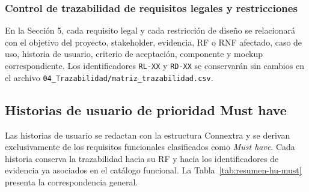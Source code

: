 \documentclass[12pt,a4paper]{article}
\begin{document}
\subsubsection{Control de trazabilidad de requisitos legales y restricciones}

En la Sección 5, cada requisito legal y cada restricción de diseño se relacionará con el objetivo del proyecto, stakeholder, evidencia, RF o RNF afectado, caso de uso, historia de usuario, criterio de aceptación, componente y mockup correspondiente. Los identificadores \texttt{RL-XX} y \texttt{RD-XX} se conservarán sin cambios en el archivo \texttt{04\_Trazabilidad/matriz\_trazabilidad.csv}.



\subsection{Historias de usuario de prioridad Must have}

Las historias de usuario se redactan con la estructura Connextra y se derivan exclusivamente de los requisitos funcionales clasificados como \emph{Must have}. Cada historia conserva la trazabilidad hacia su RF y hacia los identificadores de evidencia ya asociados en el catálogo funcional. La Tabla~\ref{tab:resumen-hu-must} presenta la correspondencia general.
\end{document}
